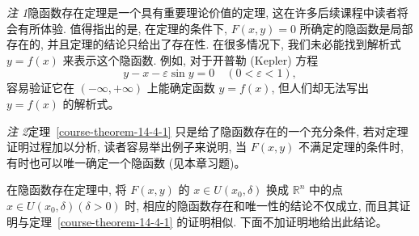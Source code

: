 \documentclass[UTF8,12pt,a4paper,fontset=fandol]{ctexart}
\begin{document}
\noindent\emph{注 1}\quad 隐函数存在定理是一个具有重要理论价值的定理, 这在许多后续课程中读者将会有所体验. 值得指出的是, 在定理的条件下, $F(x,y)=0$ 所确定的隐函数是局部存在的, 并且定理的结论只给出了存在性. 在很多情况下, 我们未必能找到解析式 $y=f(x)$ 来表示这个隐函数. 例如, 对于开普勒 (Kepler) 方程
\[
  y-x-\varepsilon\sin y=0\quad(0<\varepsilon<1),
\]
容易验证它在 $(-\infty,+\infty)$ 上能确定函数 $y=f(x)$, 但人们却无法写出 $y=f(x)$ 的解析式。

\noindent\emph{注 2}\quad 定理~\ref{course-theorem-14-4-1}  只是给了隐函数存在的一个充分条件, 若对定理证明过程加以分析, 读者容易举出例子来说明, 当 $F(x,y)$ 不满足定理的条件时, 有时也可以唯一确定一个隐函数 (见本章习题)。

在隐函数存在定理中, 将 $F(x,y)$ 的 $x\in U(x_0,\delta)$ 换成 $\mathbb R^n$ 中的点 $x\in U(x_0,\delta)(\delta>0)$ 时, 相应的隐函数存在和唯一性的结论不仅成立, 而且其证明与定理~\ref{course-theorem-14-4-1}  的证明相似. 下面不加证明地给出此结论。
\end{document}
